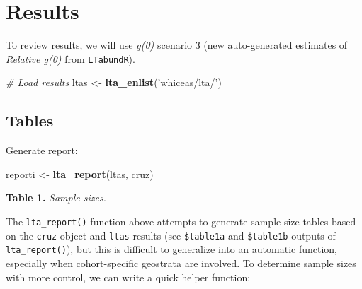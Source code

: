 \documentclass[
]{book}
\newenvironment{Shaded}{\begin{snugshade}}{\end{snugshade}}
\newcommand{\CommentTok}[1]{\textcolor[rgb]{0.56,0.35,0.01}{\textit{#1}}}
\newcommand{\DataTypeTok}[1]{\textcolor[rgb]{0.13,0.29,0.53}{#1}}
\newcommand{\KeywordTok}[1]{\textcolor[rgb]{0.13,0.29,0.53}{\textbf{#1}}}
\newcommand{\NormalTok}[1]{#1}
\newcommand{\OperatorTok}[1]{\textcolor[rgb]{0.81,0.36,0.00}{\textbf{#1}}}
\newcommand{\OtherTok}[1]{\textcolor[rgb]{0.56,0.35,0.01}{#1}}
\newcommand{\StringTok}[1]{\textcolor[rgb]{0.31,0.60,0.02}{#1}}
\begin{document}
\begin{Shaded}
\end{Shaded}

\hypertarget{results}{%
\section*{Results}\label{results}}

To review results, we will use \emph{g(0)} scenario 3 (new auto-generated estimates of \emph{Relative g(0)} from \texttt{LTabundR}).

\begin{Shaded}
\begin{Highlighting}[]
\CommentTok{# Load results}
\NormalTok{ltas <-}\StringTok{ }\KeywordTok{lta_enlist}\NormalTok{(}\StringTok{'whiceas/lta/'}\NormalTok{)}
\end{Highlighting}
\end{Shaded}

\hypertarget{tables-1}{%
\subsection*{Tables}\label{tables-1}}

Generate report:

\begin{Shaded}
\begin{Highlighting}[]
\NormalTok{reporti <-}\StringTok{ }\KeywordTok{lta_report}\NormalTok{(ltas, cruz)}
\end{Highlighting}
\end{Shaded}

\textbf{Table 1.} \emph{Sample sizes.}

The \texttt{lta\_report()} function above attempts to generate sample size tables based on the \texttt{cruz} object and \texttt{ltas} results (see \texttt{\$table1a} and \texttt{\$table1b} outputs of \texttt{lta\_report()}), but this is difficult to generalize into an automatic function, especially when cohort-specific geostrata are involved. To determine sample sizes with more control, we can write a quick helper function:
\end{document}
